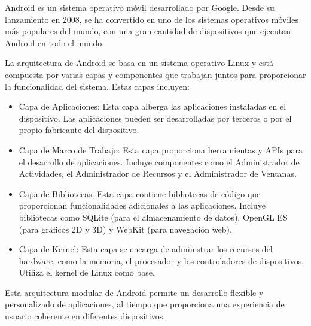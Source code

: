 \documentclass[11pt,twoside]{book}
\begin{document}
Android es un sistema operativo móvil desarrollado por Google. Desde su lanzamiento en 2008, se ha convertido en uno de los sistemas operativos móviles más populares del mundo, con una gran cantidad de dispositivos que ejecutan Android en todo el mundo.

La arquitectura de Android se basa en un sistema operativo Linux y está compuesta por varias capas y componentes que trabajan juntos para proporcionar la funcionalidad del sistema. Estas capas incluyen:
\begin{itemize}


  \item Capa de Aplicaciones: Esta capa alberga las aplicaciones instaladas en el dispositivo. Las aplicaciones pueden ser desarrolladas por terceros o por el propio fabricante del dispositivo.

  \item Capa de Marco de Trabajo: Esta capa proporciona herramientas y APIs para el desarrollo de aplicaciones. Incluye componentes como el Administrador de Actividades, el Administrador de Recursos y el Administrador de Ventanas.

  \item Capa de Bibliotecas: Esta capa contiene bibliotecas de código que proporcionan funcionalidades adicionales a las aplicaciones. Incluye bibliotecas como SQLite (para el almacenamiento de datos), OpenGL ES (para gráficos 2D y 3D) y WebKit (para navegación web).

  \item Capa de Kernel: Esta capa se encarga de administrar los recursos del hardware, como la memoria, el procesador y los controladores de dispositivos. Utiliza el kernel de Linux como base.
\end{itemize}
Esta arquitectura modular de Android permite un desarrollo flexible y personalizado de aplicaciones, al tiempo que proporciona una experiencia de usuario coherente en diferentes dispositivos.
\end{document}
